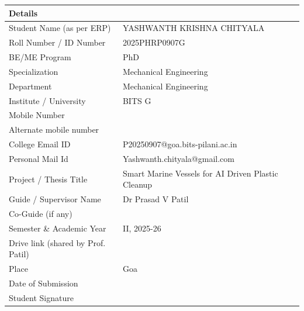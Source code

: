 \documentclass[12pt,a4paper]{report}
\begin{document}
\begin{table}[h!]
    \centering
    \renewcommand{\arraystretch}{1.4}
    \begin{tabularx}{\textwidth}{|>{\raggedright\arraybackslash\hsize=0.35\hsize}X|>{\raggedright\arraybackslash\hsize=0.65\hsize}X|}
        \hline
        \textbf{Details} & \\
        \hline
        Student Name (as per ERP) & YASHWANTH KRISHNA CHITYALA \\
        \hline
        Roll Number / ID Number & 2025PHRP0907G \\
        \hline
        BE/ME Program & PhD \\
        \hline
        Specialization & Mechanical Engineering \\
        \hline
        Department & Mechanical Engineering \\
        \hline
        Institute / University & BITS G \\
        \hline
        Mobile Number & 9912749300 \\
        \hline
        Alternate mobile number & \\
        \hline
        College Email ID & P20250907@goa.bits-pilani.ac.in \\
        \hline
        Personal Mail Id & Yashwanth.chityala@gmail.com \\
        \hline
        Project / Thesis Title & Smart Marine Vessels for AI Driven Plastic Cleanup \\
        \hline
        Guide / Supervisor Name & Dr Prasad V Patil \\
        \hline
        Co-Guide (if any) & \\
        \hline
        Semester \& Academic Year & II, 2025-26 \\
        \hline
        Drive link (shared by Prof. Patil) & \\
        \hline
        Place & Goa \\
        \hline
        Date of Submission & \\
        \hline
        Student Signature & \\
        \hline
    \end{tabularx}
\end{table}
\end{document}
